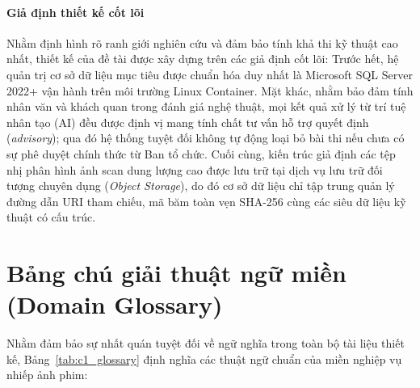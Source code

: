 \paragraph{Giả định thiết kế cốt lõi}
Nhằm định hình rõ ranh giới nghiên cứu và đảm bảo tính khả thi kỹ thuật cao nhất, thiết kế của đề tài được xây dựng trên các giả định cốt lõi: Trước hết, hệ quản trị cơ sở dữ liệu mục tiêu được chuẩn hóa duy nhất là Microsoft SQL Server 2022+ vận hành trên môi trường Linux Container. Mặt khác, nhằm bảo đảm tính nhân văn và khách quan trong đánh giá nghệ thuật, mọi kết quả xử lý từ trí tuệ nhân tạo (AI) đều được định vị mang tính chất tư vấn hỗ trợ quyết định (\textit{advisory}); qua đó hệ thống tuyệt đối không tự động loại bỏ bài thi nếu chưa có sự phê duyệt chính thức từ Ban tổ chức. Cuối cùng, kiến trúc giả định các tệp nhị phân hình ảnh scan dung lượng cao được lưu trữ tại dịch vụ lưu trữ đối tượng chuyên dụng (\textit{Object Storage}), do đó cơ sở dữ liệu chỉ tập trung quản lý đường dẫn URI tham chiếu, mã băm toàn vẹn SHA-256 cùng các siêu dữ liệu kỹ thuật có cấu trúc.

\section{Bảng chú giải thuật ngữ miền (Domain Glossary)}
\label{s:c1_glossary}

Nhằm đảm bảo sự nhất quán tuyệt đối về ngữ nghĩa trong toàn bộ tài liệu thiết kế, Bảng~\ref{tab:c1_glossary} định nghĩa các thuật ngữ chuẩn của miền nghiệp vụ nhiếp ảnh phim:

